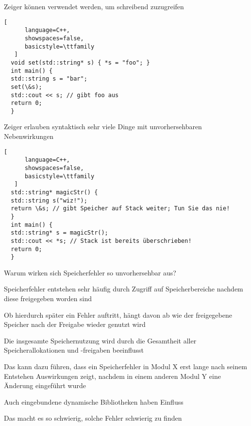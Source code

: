 \documentclass[10pt]{article}
\begin{document}
\begin{itemize*}
  \item Zeiger können verwendet werden, um schreibend zuzugreifen
  \begin{lstlisting}[
      language=C++,
      showspaces=false,
      basicstyle=\ttfamily
   ]
  void set(std::string* s) { *s = "foo"; }
  int main() {
  std::string s = "bar";
  set(\&s);
  std::cout << s; // gibt foo aus
  return 0;
  }
  \end{lstlisting}
  
  \item Zeiger erlauben syntaktisch sehr viele Dinge mit unvorhersehbaren Nebenwirkungen
  \begin{lstlisting}[
      language=C++,
      showspaces=false,
      basicstyle=\ttfamily
   ]
  std::string* magicStr() {
  std::string s("wiz!");
  return \&s; // gibt Speicher auf Stack weiter; Tun Sie das nie!
  }
  int main() {
  std::string* s = magicStr();
  std::cout << *s; // Stack ist bereits überschrieben!
  return 0;
  }
  \end{lstlisting}
\end{itemize*}


Warum wirken sich Speicherfehler so unvorhersehbar aus?
\begin{itemize*}
  \item Speicherfehler entstehen sehr häufig durch Zugriff auf Speicherbereiche nachdem diese freigegeben worden sind
  \item Ob hierdurch später ein Fehler auftritt, hängt davon ab wie der freigegebene Speicher nach der Freigabe wieder genutzt wird
  \item Die insgesamte Speichernutzung wird durch die Gesamtheit aller Speicherallokationen und -freigaben beeinflusst
  \item Das kann dazu führen, dass ein Speicherfehler in Modul X erst lange nach seinem Entstehen Auswirkungen zeigt, nachdem in einem anderen Modul Y eine Änderung eingeführt wurde
  \item Auch eingebundene dynamische Bibliotheken haben Einfluss
  \item Das macht es so schwierig, solche Fehler schwierig zu finden
\end{itemize*}
\end{document}
